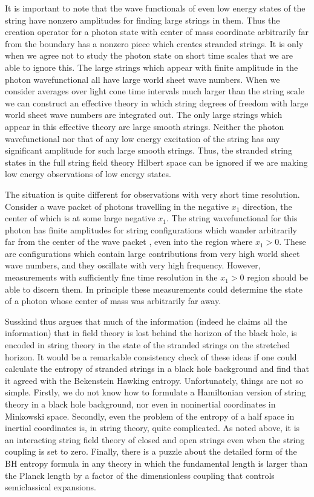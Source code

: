 It is important to note that the wave functionals of even low energy states
of the string have nonzero
amplitudes for finding large strings in them.  Thus the creation operator for
a photon state with
center of mass coordinate arbitrarily far from
 the boundary has a nonzero piece which
creates stranded strings.  It is only when we agree not to study the photon
state on short time
scales that we are able to ignore this.  The large strings which appear with
finite amplitude in the photon
wavefunctional all have large world sheet wave numbers.  When we consider
averages over
light cone time intervals much larger than the string scale we can construct
an effective theory
in which string degrees of freedom with large world sheet wave numbers are
integrated out.  The only large
strings which appear in this effective theory are large smooth strings.
Neither the photon wavefunctional nor
that of any low energy excitation of the string has any significant amplitude
for such large smooth strings.
Thus, the stranded string states in the full string field theory Hilbert
space can be ignored
if we are making low energy observations of low energy states.

The situation is quite different for
observations with very short time resolution.   Consider a wave packet of
photons
 travelling in the negative $x_1$ direction, the center of which is at some
large negative $x_1$.
The string wavefunctional for this photon has finite amplitudes for string
configurations which
wander arbitrarily far from the center of the wave packet , even into the
region where $x_1 > 0$.
These are configurations which contain large contributions from very high
world sheet wave numbers, and
they oscillate with very high frequency.  However, measurements with
sufficiently fine time resolution
in the $x_1 > 0$ region should be able to discern them.  In principle
these measurements could determine the state of a photon whose center
of mass was arbitrarily far away.

Susskind thus argues that much of the information (indeed he claims all
the information) that in field theory is lost behind the horizon of the
black hole, is encoded in string theory in the state of the stranded
strings on the stretched horizon.
It would be a remarkable consistency check of these ideas if one could
calculate the entropy of stranded strings in a black hole background and
find that it agreed with the Bekenstein Hawking entropy.
Unfortunately,
things are not so simple.
Firstly, we do not know how to formulate a Hamiltonian version of string
theory in a black hole background, nor even in noninertial coordinates
in Minkowski space.  Secondly, even the problem of the
entropy of a half space in inertial coordinates is, in string theory, quite complicated.  As
noted above, it is an interacting string field theory of closed and open
strings even when the string coupling is set to zero.
Finally, there is a puzzle about the detailed form of the BH entropy
formula in any theory in which the fundamental length is larger than the
Planck length by a factor of the dimensionless coupling that controls
semiclassical expansions.

